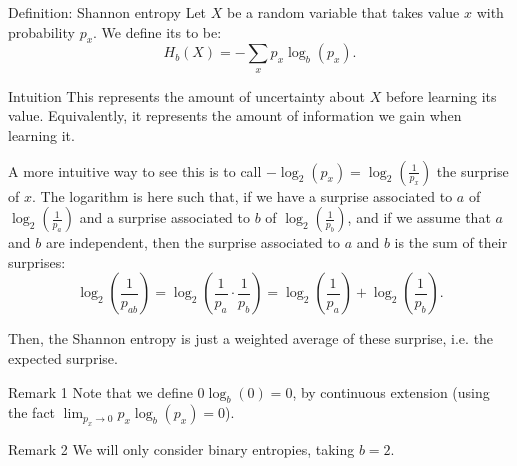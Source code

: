 \documentclass[a4paper]{article}
\begin{document}
\begin{parag}{Definition: Shannon entropy}
    Let $X$ be a random variable that takes value $x$ with probability $p_x$. We define its  to be: 
    \[H_b\left(X\right) = - \sum_{x} p_x \log_{b}\left(p_x\right).\]

    \begin{subparag}{Intuition}
        This represents the amount of uncertainty about $X$ before learning its value. Equivalently, it represents the amount of information we gain when learning it.

        A more intuitive way to see this is to call $-\log_{2}\left(p_x\right) = \log_2\left(\frac{1}{p_x}\right)$ the surprise of $x$. The logarithm is here such that, if we have a surprise associated to $a$ of $\log_{2}\left(\frac{1}{p_a}\right)$ and a surprise associated to $b$ of $\log_{2}\left(\frac{1}{p_b}\right)$, and if we assume that $a$ and $b$ are independent, then the surprise associated to $a$ and $b$ is the sum of their surprises:
        \[\log_2\left(\frac{1}{p_{ab}}\right) = \log_2\left(\frac{1}{p_a}\cdot \frac{1}{p_b}\right) = \log_{2}\left(\frac{1}{p_a}\right) + \log_{2}\left(\frac{1}{p_b}\right).\]

        Then, the Shannon entropy is just a weighted average of these surprise, i.e. the expected surprise.
    \end{subparag}
    
    \begin{subparag}{Remark 1}
        Note that we define $0 \log_{b}\left(0\right) = 0$, by continuous extension (using the fact $\lim_{p_x \to 0} p_x \log_{b}\left(p_x\right) = 0$).
    \end{subparag}

    \begin{subparag}{Remark 2}
        We will only consider binary entropies, taking $b = 2$.
    \end{subparag}
\end{parag}
\end{document}
